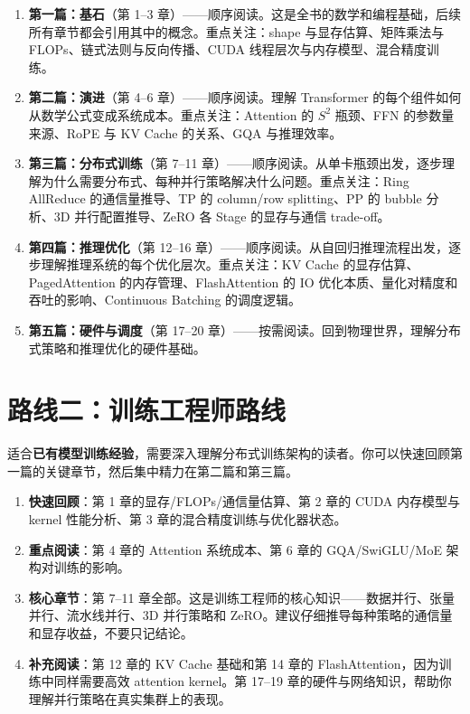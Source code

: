 \begin{enumerate}
\item \textbf{第一篇：基石}（第 1--3 章）——顺序阅读。这是全书的数学和编程基础，后续所有章节都会引用其中的概念。重点关注：shape 与显存估算、矩阵乘法与 FLOPs、链式法则与反向传播、CUDA 线程层次与内存模型、混合精度训练。
\item \textbf{第二篇：演进}（第 4--6 章）——顺序阅读。理解 Transformer 的每个组件如何从数学公式变成系统成本。重点关注：Attention 的 $S^2$ 瓶颈、FFN 的参数量来源、RoPE 与 KV Cache 的关系、GQA 与推理效率。
\item \textbf{第三篇：分布式训练}（第 7--11 章）——顺序阅读。从单卡瓶颈出发，逐步理解为什么需要分布式、每种并行策略解决什么问题。重点关注：Ring AllReduce 的通信量推导、TP 的 column/row splitting、PP 的 bubble 分析、3D 并行配置推导、ZeRO 各 Stage 的显存与通信 trade-off。
\item \textbf{第四篇：推理优化}（第 12--16 章）——顺序阅读。从自回归推理流程出发，逐步理解推理系统的每个优化层次。重点关注：KV Cache 的显存估算、PagedAttention 的内存管理、FlashAttention 的 IO 优化本质、量化对精度和吞吐的影响、Continuous Batching 的调度逻辑。
\item \textbf{第五篇：硬件与调度}（第 17--20 章）——按需阅读。回到物理世界，理解分布式策略和推理优化的硬件基础。
\end{enumerate}

\section*{路线二：训练工程师路线}

适合\textbf{已有模型训练经验}，需要深入理解分布式训练架构的读者。你可以快速回顾第一篇的关键章节，然后集中精力在第二篇和第三篇。

\begin{enumerate}
\item \textbf{快速回顾}：第 1 章的显存/FLOPs/通信量估算、第 2 章的 CUDA 内存模型与 kernel 性能分析、第 3 章的混合精度训练与优化器状态。
\item \textbf{重点阅读}：第 4 章的 Attention 系统成本、第 6 章的 GQA/SwiGLU/MoE 架构对训练的影响。
\item \textbf{核心章节}：第 7--11 章全部。这是训练工程师的核心知识——数据并行、张量并行、流水线并行、3D 并行策略和 ZeRO。建议仔细推导每种策略的通信量和显存收益，不要只记结论。
\item \textbf{补充阅读}：第 12 章的 KV Cache 基础和第 14 章的 FlashAttention，因为训练中同样需要高效 attention kernel。第 17--19 章的硬件与网络知识，帮助你理解并行策略在真实集群上的表现。
\end{enumerate}

